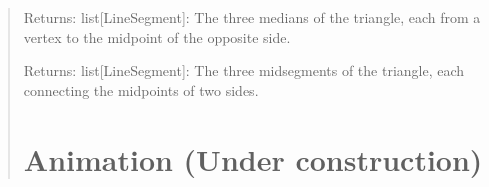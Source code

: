 \documentclass[letterpaper,10pt,english]{sphinxmanual}
\begin{document}
\begin{quote}
\begin{fulllineitems}

\begin{fulllineitems}
\label{\detokenize{pygeox:pygeox.custom_objects.Triangle.medians}}
\pysigstartsignatures
\pysigline
{}
\pysigstopsignatures
\sphinxAtStartPar
Returns:
list{[}LineSegment{]}: The three medians of the triangle, each from a vertex to the midpoint of the opposite side.

\end{fulllineitems}


\begin{fulllineitems}
\label{\detokenize{pygeox:pygeox.custom_objects.Triangle.midsegments}}
\pysigstartsignatures
\pysigline
{}
\pysigstopsignatures
\sphinxAtStartPar
Returns:
list{[}LineSegment{]}: The three midsegments of the triangle, each connecting the midpoints of two sides.

\end{fulllineitems}


\begin{fulllineitems}
\label{\detokenize{pygeox:pygeox.custom_objects.Triangle.orthocenter}}
\pysigstartsignatures
\pysigline
{}
\pysigstopsignatures
\end{fulllineitems}


\end{fulllineitems}



\chapter{Animation (Under construction)}
\label{\detokenize{pygeox:animation-under-construction}}\label{\detokenize{pygeox:module-pygeox.animate}}


\end{quote}
\end{document}
